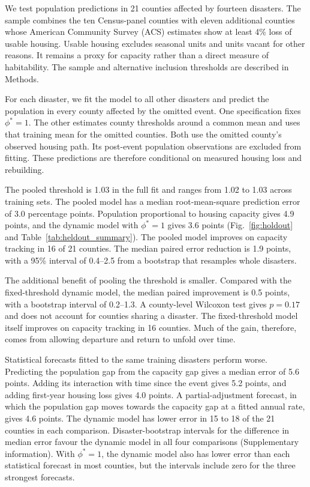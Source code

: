 \documentclass[11pt]{article}
\begin{document}
We test population predictions in 21 counties affected by fourteen disasters. The sample combines the ten Census-panel counties with eleven additional counties whose American Community Survey (ACS) estimates show at least 4\% loss of usable housing. Usable housing excludes seasonal units and units vacant for other reasons. It remains a proxy for capacity rather than a direct measure of habitability. The sample and alternative inclusion thresholds are described in Methods.

For each disaster, we fit the model to all other disasters and predict the population in every county affected by the omitted event. One specification fixes $\phi^*=1$. The other estimates county thresholds around a common mean and uses that training mean for the omitted counties. Both use the omitted county's observed housing path. Its post-event population observations are excluded from fitting. These predictions are therefore conditional on measured housing loss and rebuilding.

The pooled threshold is 1.03 in the full fit and ranges from 1.02 to 1.03 across training sets. The pooled model has a median root-mean-square prediction error of 3.0 percentage points. Population proportional to housing capacity gives 4.9 points, and the dynamic model with $\phi^*=1$ gives 3.6 points (Fig.~\ref{fig:holdout} and Table~\ref{tab:heldout_summary}). The pooled model improves on capacity tracking in 16 of 21 counties. The median paired error reduction is 1.9 points, with a 95\% interval of 0.4--2.5 from a bootstrap that resamples whole disasters.

The additional benefit of pooling the threshold is smaller. Compared with the fixed-threshold dynamic model, the median paired improvement is 0.5 points, with a bootstrap interval of 0.2--1.3. A county-level Wilcoxon test gives $p=0.17$ and does not account for counties sharing a disaster. The fixed-threshold model itself improves on capacity tracking in 16 counties. Much of the gain, therefore, comes from allowing departure and return to unfold over time.

Statistical forecasts fitted to the same training disasters perform worse. Predicting the population gap from the capacity gap gives a median error of 5.6 points. Adding its interaction with time since the event gives 5.2 points, and adding first-year housing loss gives 4.0 points. A partial-adjustment forecast, in which the population gap moves towards the capacity gap at a fitted annual rate, gives 4.6 points. The dynamic model has lower error in 15 to 18 of the 21 counties in each comparison. Disaster-bootstrap intervals for the difference in median error favour the dynamic model in all four comparisons (Supplementary information). With $\phi^*=1$, the dynamic model also has lower error than each statistical forecast in most counties, but the intervals include zero for the three strongest forecasts.
\end{document}
